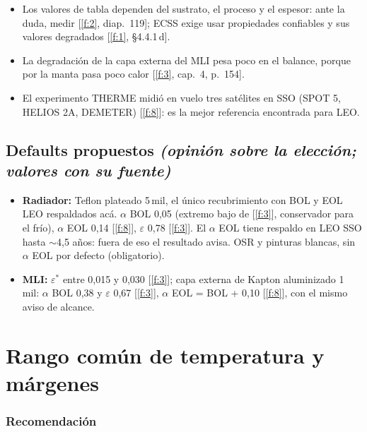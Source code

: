 \documentclass[11pt,a4paper]{article}
\newcommand{\op}[1]{\textcolor{opinion}{\textit{(#1)}}}
\newcommand{\f}[1]{\ref{f:#1}}
\begin{document}
\begin{itemize}
  \item Los valores de tabla dependen del sustrato, el proceso y el espesor: ante la duda, medir [\f{2}, diap.~119]; ECSS exige usar propiedades confiables y sus valores degradados [\f{1}, §4.4.1\,d].
  \item La degradación de la capa externa del MLI pesa poco en el balance, porque por la manta pasa poco calor [\f{3}, cap.~4, p.~154].
  \item El experimento THERME midió en vuelo tres satélites en SSO (SPOT 5, HELIOS 2A, DEMETER) [\f{8}]: es la mejor referencia encontrada para LEO.
\end{itemize}

\subsection{Defaults propuestos \normalfont\op{opinión sobre la elección; valores con su fuente}}

\begin{itemize}
  \item \textbf{Radiador:} Teflon plateado 5\,mil, el único recubrimiento con BOL y EOL LEO respaldados acá. $\alpha$ BOL 0,05 (extremo bajo de [\f{3}], conservador para el frío), $\alpha$ EOL 0,14 [\f{8}], $\varepsilon$ 0,78 [\f{3}]. El $\alpha$ EOL tiene respaldo en LEO SSO hasta $\sim$4,5 años: fuera de eso el resultado avisa. OSR y pinturas blancas, sin $\alpha$ EOL por defecto (obligatorio).
  \item \textbf{MLI:} $\varepsilon^*$ entre 0,015 y 0,030 [\f{3}]; capa externa de Kapton aluminizado 1\,mil: $\alpha$ BOL 0,38 y $\varepsilon$ 0,67 [\f{3}], $\alpha$ EOL = BOL + 0,10 [\f{8}], con el mismo aviso de alcance.
\end{itemize}

\section{Rango común de temperatura y márgenes}\label{sec:rango}

\subsubsection*{Recomendación}
\end{document}
